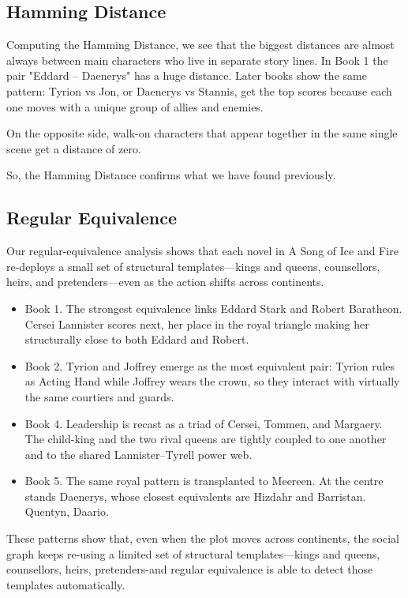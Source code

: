 \documentclass[12pt, a4paper]{article}
\begin{document}
	\subsection*{Hamming Distance}
	
	Computing the Hamming Distance, we see that the biggest distances are almost always between main characters who live in separate story lines.
	In Book 1 the pair "Eddard – Daenerys" has a huge distance.
	Later books show the same pattern: Tyrion vs Jon, or Daenerys vs Stannis, get the top scores because each one moves with a unique group of allies and enemies.
	
	On the opposite side, walk-on characters that appear together in the same single scene get a distance of zero.
	
	
	So, the Hamming Distance confirms what we have found previously.
	
	
	\subsection*{Regular Equivalence}
	
	Our regular-equivalence analysis shows that each novel in A Song of Ice and Fire re-deploys a small set of structural templates—kings and queens, counsellors, heirs, and pretenders—even as the action shifts across continents.
	
	\begin{itemize}
		\item Book 1. The strongest equivalence links Eddard Stark and Robert Baratheon. Cersei Lannister scores next, her place in the royal triangle making her structurally close to both Eddard and Robert.
		\item Book 2. Tyrion and Joffrey emerge as the most equivalent pair: Tyrion rules as Acting Hand while Joffrey wears the crown, so they interact with virtually the same courtiers and guards.
		\item Book 4. Leadership is recast as a triad of Cersei, Tommen, and Margaery. The child-king and the two rival queens are tightly coupled to one another and to the shared Lannister–Tyrell power web.
		\item Book 5. The same royal pattern is transplanted to Meereen. At the centre stands Daenerys, whose closest equivalents are Hizdahr and Barristan. Quentyn, Daario.
	\end{itemize}
	
	These patterns show that, even when the plot moves across continents, the social graph keeps re-using a limited set of structural templates—kings and queens, counsellors, heirs, pretenders-and regular equivalence is able to detect those templates automatically.
	
\end{document}
